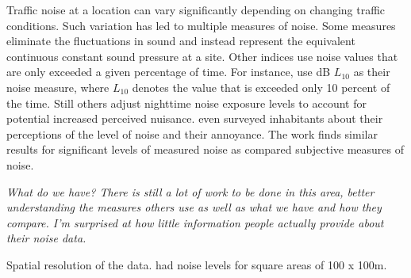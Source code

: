 \documentclass{article}\usepackage{graphicx, color}
\begin{document}
Traffic noise at a location can vary significantly depending on changing traffic conditions. Such variation has led to multiple measures of noise. Some measures eliminate the fluctuations in sound and instead represent the equivalent continuous constant sound pressure at a site. Other indices use noise values that are only exceeded a given percentage of time. For instance, \citet{Huang;Palmquist2001} use dB $L_{10}$ as their noise measure, where $L_{10}$ denotes the value that is exceeded only 10 percent of the time. Still others adjust nighttime noise exposure levels to account for potential increased perceived nuisance. \citet{Baranzini2010} even surveyed inhabitants about their perceptions of the level of noise and their annoyance. The work finds similar results for significant levels of measured noise as compared subjective measures of noise. 

\emph{What do we have? There is still a lot of work to be done in this area, better understanding the measures others use as well as what we have and how they compare. I'm surprised at how little information people actually provide about their noise data.}

Spatial resolution of the data. \citet{Theebe2004a} had noise levels for square areas of 100 x 100m.

% 
\end{document}
